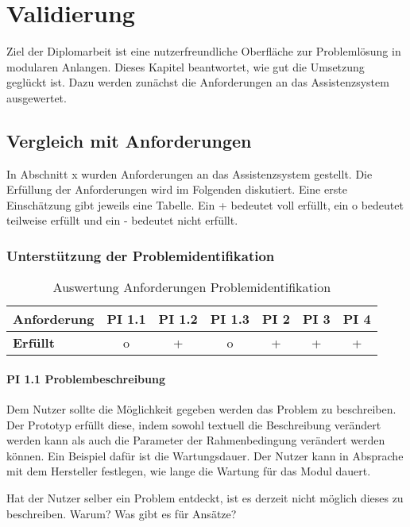 \chapter{Validierung}
\label{Validierung}

Ziel der Diplomarbeit ist eine nutzerfreundliche Oberfläche zur Problemlösung in modularen Anlangen. Dieses Kapitel beantwortet, wie gut die Umsetzung geglückt ist. Dazu werden zunächst die Anforderungen an das Assistenzsystem ausgewertet. 

\section{Vergleich mit Anforderungen}
In Abschnitt x wurden Anforderungen an das Assistenzsystem gestellt. Die Erfüllung der Anforderungen wird im Folgenden diskutiert. Eine erste Einschätzung gibt jeweils eine Tabelle. Ein + bedeutet voll erfüllt, ein o bedeutet teilweise erfüllt und ein - bedeutet nicht erfüllt.

\subsection{Unterstützung der Problemidentifikation}

\begin{table}[htbp]
\centering
\begin{tabular}{l|c|c|c|c|c|c}
\textbf{Anforderung} & PI 1.1 & PI 1.2 & PI 1.3 & PI 2 & PI 3 & PI 4 \\
\hline
\textbf{Erfüllt} & o & + & o & + & + & + \\
\end{tabular}
\caption{Auswertung Anforderungen Problemidentifikation}
\label{tab:Anforderungen-Problemidentifikation}
\end{table}

\subsubsection*{PI 1.1 Problembeschreibung}
Dem Nutzer sollte die Möglichkeit gegeben werden das Problem zu beschreiben. Der Prototyp erfüllt diese, indem sowohl textuell die Beschreibung verändert werden kann als auch die Parameter der Rahmenbedingung verändert werden können. Ein Beispiel dafür ist die Wartungsdauer. Der Nutzer kann in Absprache mit dem Hersteller festlegen, wie lange die Wartung für das Modul dauert.

Hat der Nutzer selber ein Problem entdeckt, ist es derzeit nicht möglich dieses zu beschreiben. 
Warum?
Was gibt es für Ansätze?

